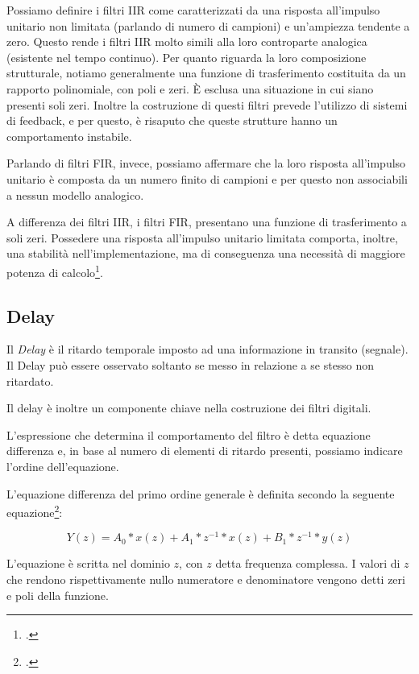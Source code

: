 Possiamo definire i filtri IIR come caratterizzati da una risposta all’impulso
unitario non limitata (parlando di numero di campioni) e un’ampiezza tendente
a zero. Questo rende i filtri IIR molto simili alla loro controparte analogica
(esistente nel tempo continuo). Per quanto riguarda la loro composizione
strutturale, notiamo generalmente una funzione di trasferimento costituita da
un rapporto polinomiale, con poli e zeri. È esclusa una situazione in cui siano
presenti soli zeri. Inoltre la costruzione di questi filtri prevede l’utilizzo
di sistemi di feedback, e per questo, è risaputo che queste strutture hanno un
comportamento instabile.

Parlando di filtri FIR, invece, possiamo affermare che la loro risposta
all’impulso unitario è composta da un numero finito di campioni e per questo
non associabili a nessun modello analogico.

A differenza dei filtri IIR, i filtri FIR, presentano una funzione di
trasferimento a soli zeri. Possedere una risposta all’impulso unitario limitata
comporta, inoltre, una stabilità nell'implementazione, ma di conseguenza una
necessità di maggiore potenza di calcolo\footcite{ld:book}.


\subsection{Delay}

Il \emph{Delay} è il ritardo temporale imposto ad una informazione in transito
(segnale). Il Delay può essere osservato soltanto se messo in relazione a se
stesso non ritardato.

Il delay è inoltre un componente chiave nella costruzione dei filtri digitali.

L’espressione che determina il comportamento del filtro è detta equazione
differenza e, in base al numero di elementi di ritardo presenti, possiamo
indicare l’ordine dell’equazione.

L’equazione differenza del primo ordine generale è definita secondo la seguente
equazione\footcite{sp:book}:

\begin{equation}
Y(z)=A_0*x(z) + A_1*z^{-1}*x(z) + B_1*z^{-1}*y(z)
\end{equation}

L’equazione è scritta nel dominio $z$, con $z$ detta frequenza complessa.
I valori di $z$ che rendono rispettivamente nullo numeratore e denominatore
vengono detti zeri e poli della funzione.

